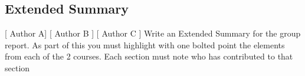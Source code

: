 \subsection*{Extended Summary}
[ Author A] [ Author B ] [ Author C ] 
\newline
Write an Extended Summary for the group report.
As part of this you must highlight with one bolted point the elements from each of the 2 courses.
Each section must note who has contributed to that section